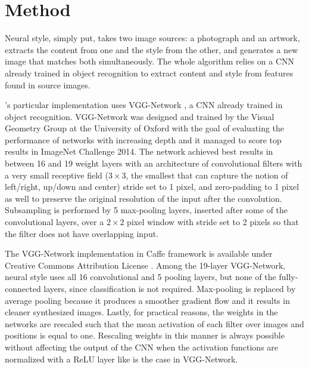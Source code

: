 
\section{Method}
\label{sec:system:method}

Neural style, simply put, takes two image sources: a photograph and an artwork, extracts the content from one and the style from the other, and generates a new image that matches both simultaneously.
The whole algorithm relies on a CNN already trained in object recognition to extract content and style from features found in source images.


\citeauthor{Gatys2015B}'s particular implementation uses VGG-Network \cite{Simonyan2014}, a CNN already trained in object recognition.
VGG-Network was designed and trained by the Visual Geometry Group at the University of Oxford with the goal of evaluating the performance of networks with increasing depth and it managed to score top results in ImageNet Challenge 2014.
The network achieved best results in between 16 and 19 weight layers with an architecture of convolutional filters with a very small receptive field (${3}\times{3}$, the smallest that can capture the notion of left/right, up/down and center) stride set to 1 pixel, and zero-padding to 1 pixel as well to preserve the original resolution of the input after the convolution.
Subsampling is performed by 5 max-pooling layers, inserted after some of the convolutional layers, over a ${2}\times{2}$ pixel window with stride set to 2 pixels so that the filter does not have overlapping input.

The VGG-Network implementation in Caffe framework is available under Creative Commons Attribution License \cite{Simonyan2014web}.
Among the 19-layer VGG-Network, neural style uses all 16 convolutional and 5 pooling layers, but none of the fully-connected layers, since classification is not required.
Max-pooling is replaced by average pooling because it produces a smoother gradient flow \cite{Boureau2010} and it results in cleaner synthesized images.
Lastly, for practical reasons, the weights in the networks are rescaled such that the mean activation of each filter over images and positions is equal to one.
Rescaling weights in this manner is always possible without affecting the output of the CNN when the activation functions are normalized with a ReLU layer like is the case in VGG-Network.

